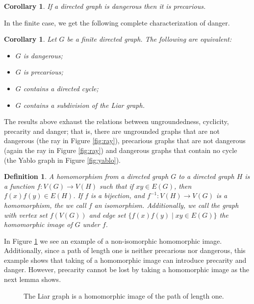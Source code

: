 \documentclass[12pt]{kluwer}
\newtheorem{cor}[thm]{Corollary}
\newtheorem{defn}{Definition}
\theoremstyle{remark}
\begin{document}
\begin{cor}
If a directed graph is dangerous then it is precarious.
\end{cor}

In the finite case, we get the following complete characterization of danger. 
\begin{cor}\label{FiniteCharacterization}
Let $G$ be a finite directed graph.  The following are equivalent:
\begin{itemize}
\item[(a)] $G$ is dangerous;
\item[(b)] $G$ is precarious;
\item[(c)] $G$ contains a directed cycle;
\item[(d)] $G$ contains a subdivision of the Liar graph.
\end{itemize}
\end{cor}

The results above exhaust the relations between ungroundedness, cyclicity, precarity and danger; that is, there are ungrounded graphs that are not dangerous (the ray in Figure \ref{fig:ray}), precarious graphs that are not dangerous (again the ray in Figure \ref{fig:ray}) and dangerous graphs that contain no cycle (the Yablo graph in Figure \ref{fig:yablo}).

\begin{defn}
A \emph{homomorphism} from a directed graph $G$ to a directed graph $H$ is a function $f:V(G) \rightarrow V(H)$ such that if $xy \in E(G)$, then $f(x)f(y) \in E(H)$.   If $f$ is a bijection, and $f^{-1}: V(H) \rightarrow V(G)$ is a homomorphism, the we call $f$ an \emph{isomorphism}.  Additionally, we call the graph with vertex set $f(V(G))$ and edge set $\{f(x)f(y) \mid xy \in E(G)\}$ the \emph{homomorphic image} of $G$ under $f$.
\end{defn}

In Figure \ref{fig:homomorphic} we see an example of a non-isomorphic homomorphic image.  Additionally, since a path of length one is neither precarious nor dangerous, this example shows that taking of a homomorphic image can introduce precarity and danger. However, precarity cannot be lost by
taking a homomorphic image as the next lemma shows.


\begin{figure}[ht]
\centering
{}
\qquad
{}
\caption{The Liar graph is a homomorphic image of the path of length one.}
\label{fig:homomorphic}
\end{figure}
\end{document}
